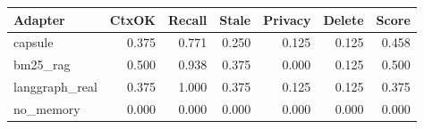 \begin{tabular}{lrrrrrr}
\hline
Adapter & CtxOK & Recall & Stale & Privacy & Delete & Score \\
\hline
capsule & 0.375 & 0.771 & 0.250 & 0.125 & 0.125 & 0.458 \\
bm25\_rag & 0.500 & 0.938 & 0.375 & 0.000 & 0.125 & 0.500 \\
langgraph\_real & 0.375 & 1.000 & 0.375 & 0.125 & 0.125 & 0.375 \\
no\_memory & 0.000 & 0.000 & 0.000 & 0.000 & 0.000 & 0.000 \\
\hline
\end{tabular}
